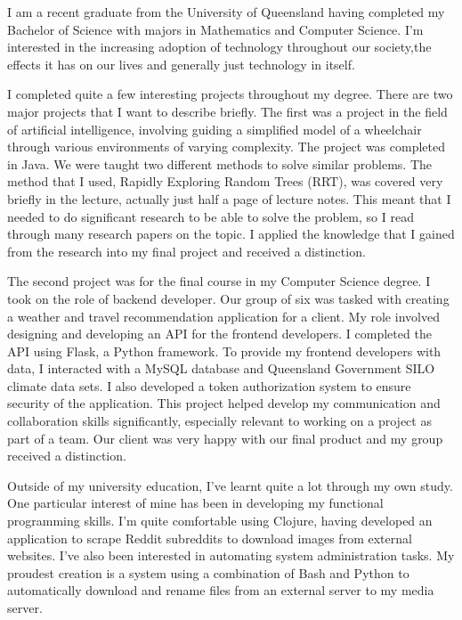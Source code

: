 \documentclass[12pt, a4paper]{awesome-cv} %
\begin{document}
\makecvheader %

\makelettertitle %


\begin{cvletter}


I am a recent graduate from the University of Queensland having completed my Bachelor of Science with majors in Mathematics and Computer Science. I'm interested in the increasing adoption of technology throughout our society,the effects it has on our lives and generally just technology in itself.

I completed quite a few interesting projects throughout my degree. There are two major projects that I want to describe briefly. The first was a project in the field of artificial intelligence, involving guiding a simplified model of a wheelchair through various environments of varying complexity. The project was completed in Java. We were taught two different methods to solve similar problems. The method that I used, Rapidly Exploring Random Trees (RRT), was covered very briefly in the lecture, actually just half a page of lecture notes. This meant that I needed to do significant research to be able to solve the problem, so I read through many  research papers on the topic. I applied the knowledge that I gained from the research into my final project and received a distinction.

The second project was for the final course in my Computer Science degree. I took on the role of backend developer. Our group of six was tasked with creating a weather and travel recommendation application for a client. My role involved designing and developing an API for the frontend developers. I completed the API using Flask, a Python framework. To provide my frontend developers with data, I interacted with a MySQL database and Queensland Government SILO climate data sets. I also developed a token authorization system to ensure security of the application. This project helped develop my communication and collaboration skills significantly, especially relevant to working on a project as part of a team. Our client was very happy with our final product and my group received a distinction.

Outside of my university education, I've learnt quite a lot through my own study. One particular interest of mine has been in developing my functional programming skills. I'm quite comfortable using Clojure, having developed an application to scrape Reddit subreddits to download images from external websites. I've also been interested in automating system administration tasks. My proudest creation is a system using a combination of Bash and Python to automatically download and rename files from an external server to my media server.


\end{cvletter}
\end{document}
